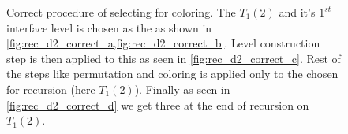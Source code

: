      \begin{figure}[thbp]
     	\centering
     	\hspace{0.6em}
     	\hspace{0.6em}
     	\hspace{0.6em}
     	\hspace{0.6em}
     	\caption{Correct procedure of selecting \subgraph for \DTWO coloring. The \levelGroup $T_1(2)$ and it's $1^{st}$ interface level is chosen as the \subgraph as shown in \cref{fig:rec_d2_correct_a,fig:rec_d2_correct_b}. Level construction step is then applied to this \subgraph as seen in \cref{fig:rec_d2_correct_c}. Rest of the steps like permutation and \DK coloring is applied only to the \subgraph  chosen for recursion (here $T_1(2)$). Finally as seen in \cref{fig:rec_d2_correct_d} we get three \levelGroups at the end of recursion on $T_1(2)$.}
     	\label{fig:rec_d2_correct}
     \end{figure}
     
